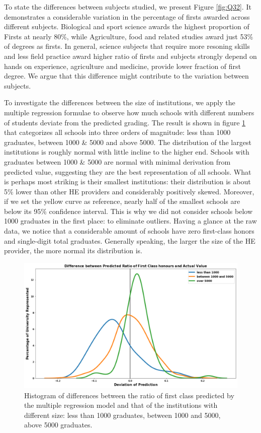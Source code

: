 \documentclass[11pt,a4paper]{article}
\begin{document}
To state the differences between subjects studied, we present Figure \ref{fig:Q32}. It demonstrates a considerable variation in the percentage of firsts awarded across different subjects. Biological and sport science awards the highest proportion of Firsts at nearly 80\%, while Agriculture, food and related studies award just 53\% of degrees as firsts. In general, science subjects that require more resoning skills and less field practice award higher ratio of firsts and subjects strongly depend on hands on experience, agriculture and medicine, provide lower fraction of first degree. We argue that this difference might contribute to the variation between subjects. 


To investigate the differences between the size of institutions, we apply the multiple regression formulae to observe how much schools with different numbers of students deviate from the predicted grading. The result is shown in figure \ref{fig:Q33} that categorizes all schools into three orders of magnitude: less than 1000 graduates, between 1000 \& 5000 and above 5000. The distribution of the largest institutions is roughly normal with little incline to the higher end. Schools with graduates between 1000 \& 5000 are normal with minimal derivation from predicted value, suggesting they are the best representation of all schools. What is perhaps most striking is their smallest institutions: their distribution is about 5\% lower than other HE providers and considerably positively skewed. Moreover, if we set the yellow curve as reference, nearly half of the smallest schools are below its 95\% confidence interval. This is why we did not consider schools below 1000 graduates in the first place: to eliminate outliers. Having a glance at the raw data, we notice that a considerable amount of schools have zero first-class honors and single-digit total graduates. Generally speaking, the larger the size of the HE provider, the more normal its distribution is. 


\begin{figure}[h]
    \centering
    \includegraphics[width=15.24cm]{report/Q33FFF.pdf}
    \caption{Histogram of differences between the ratio of first class predicted by the multiple regression model and that of the institutions with different size: less than 1000 graduates, between 1000 and 5000, above 5000 graduates. }
    \label{fig:Q33}
\end{figure}
\end{document}
